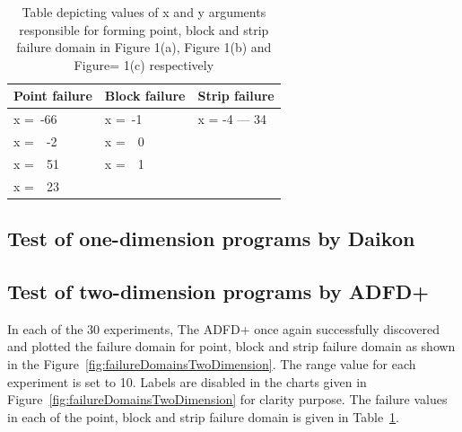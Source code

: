 \begin{table}[h]
\caption{Table depicting values of x and y arguments responsible for forming point, block and strip failure domain in Figure 1(a), Figure 1(b) and Figure= 1(c) respectively}
\bigskip
\centering
{\renewcommand{\arraystretch}{1.3}
\begin{tabular}{|l|l|l|}
\hline
Point failure		& 	Block failure		& 	Strip failure		\\
\hline
x =~-66			&	x =~-1			&	x = -4 --- 34 	\\	
x =~~-2		 	&	x =~~0			&					\\	
x =~~51 		&	x =~~1			&					\\
x =~~23 		& 	 				& 					\\
\hline
\end{tabular}
}
\bigskip
\label{table:failureDomains}
\end{table}



\subsection{Test of one-dimension programs by Daikon}


\subsection{Test of two-dimension programs by ADFD+}\label{sec:intro6_11}
In each of the 30 experiments, The ADFD+ once again successfully discovered and plotted the failure domain for point, block and strip failure domain as shown in the Figure~\ref{fig:failureDomainsTwoDimension}. The range value for each experiment is set to 10. Labels are disabled in the charts given in Figure~\ref{fig:failureDomainsTwoDimension} for clarity purpose. The failure values in each of the point, block and strip failure domain is given in Table~\ref{table:failureDomains}. 


